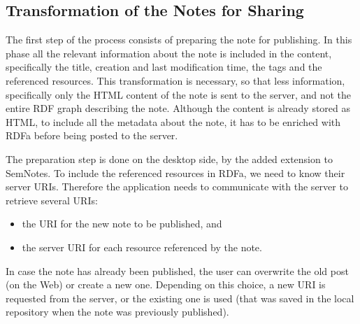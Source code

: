 \subsection{Transformation of the Notes for Sharing}

The first step of the process consists of preparing the note for publishing. In this phase all the relevant information about the note is included in the content, specifically the title, creation and last modification time, the tags and the referenced resources. This transformation is necessary, so that less information, specifically only the HTML content of the note is sent to the server, and not the entire RDF graph describing the note. Although the content is already stored as HTML, to include all the metadata about the note, it has to be enriched with RDFa before being posted to the server.

The preparation step is done on the desktop side, by the added extension to SemNotes. 
To include the referenced resources in RDFa, we need to know their server URIs. Therefore the application needs to communicate with the server to retrieve several URIs: 
\begin{itemize}
 \item the URI for the new note to be published, and 
 \item the server URI for each resource referenced by the note. 
\end{itemize}

In case the note has already been published, the user can overwrite the old post (on the Web) or create a new one. Depending on this choice, a new URI is requested from the server, or the existing one is used (that was saved in the local repository when the note was previously published). 

